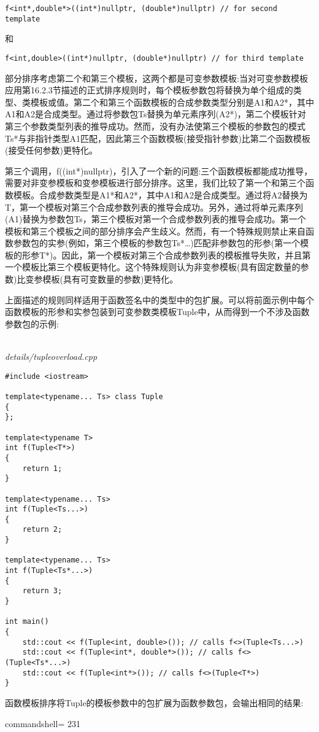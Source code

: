 \begin{lstlisting}[style=styleCXX]
f<int*,double*>((int*)nullptr, (double*)nullptr) // for second template
\end{lstlisting}

和

\begin{lstlisting}[style=styleCXX]
f<int,double>((int*)nullptr, (double*)nullptr) // for third template
\end{lstlisting}

部分排序考虑第二个和第三个模板，这两个都是可变参数模板:当对可变参数模板应用第16.2.3节描述的正式排序规则时，每个模板参数包将替换为单个组成的类型、类模板或值。第二个和第三个函数模板的合成参数类型分别是A1和A2*，其中A1和A2是合成类型。通过将参数包Ts替换为单元素序列(A2*)，第二个模板针对第三个参数类型列表的推导成功。然而，没有办法使第三个模板的参数包的模式Ts*与非指针类型A1匹配，因此第三个函数模板(接受指针参数)比第二个函数模板(接受任何参数)更特化。

第三个调用，f((int*)nullptr)，引入了一个新的问题:三个函数模板都能成功推导，需要对非变参模板和变参模板进行部分排序。这里，我们比较了第一个和第三个函数模板。合成参数类型是A1*和A2*，其中A1和A2是合成类型。通过将A2替换为T，第一个模板对第三个合成参数列表的推导会成功。另外，通过将单元素序列(A1)替换为参数包Ts，第三个模板对第一个合成参数列表的推导会成功。第一个模板和第三个模板之间的部分排序会产生歧义。然而，有一个特殊规则禁止来自函数参数包的实参(例如，第三个模板的参数包Ts*…)匹配非参数包的形参(第一个模板的形参T*)。因此，第一个模板对第三个合成参数列表的模板推导失败，并且第一个模板比第三个模板更特化。这个特殊规则认为非变参模板(具有固定数量的参数)比变参模板(具有可变数量的参数)更特化。

上面描述的规则同样适用于函数签名中的类型中的包扩展。可以将前面示例中每个函数模板的形参和实参包装到可变参数类模板Tuple中，从而得到一个不涉及函数参数包的示例:

\hspace*{\fill} \\ %
\noindent
\textit{details/tupleoverload.cpp}
\begin{lstlisting}[style=styleCXX]
#include <iostream>

template<typename... Ts> class Tuple
{
};

template<typename T>
int f(Tuple<T*>)
{
	return 1;
}

template<typename... Ts>
int f(Tuple<Ts...>)
{
	return 2;
}

template<typename... Ts>
int f(Tuple<Ts*...>)
{
	return 3;
}

int main()
{
	std::cout << f(Tuple<int, double>()); // calls f<>(Tuple<Ts...>)
	std::cout << f(Tuple<int*, double*>()); // calls f<>(Tuple<Ts*...>)
	std::cout << f(Tuple<int*>()); // calls f<>(Tuple<T*>)
}
\end{lstlisting}

函数模板排序将Tuple的模板参数中的包扩展为函数参数包，会输出相同的结果:

\begin{tcblisting}{commandshell={}}
231
\end{tcblisting}





















